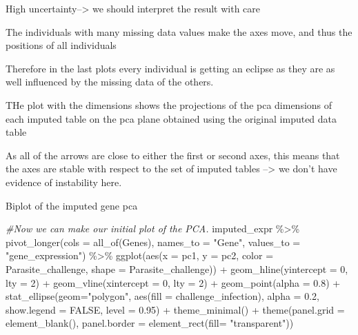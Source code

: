 \documentclass[
]{article}
\newenvironment{Shaded}{\begin{snugshade}}{\end{snugshade}}
\newcommand{\AttributeTok}[1]{\textcolor[rgb]{0.77,0.63,0.00}{#1}}
\newcommand{\CommentTok}[1]{\textcolor[rgb]{0.56,0.35,0.01}{\textit{#1}}}
\newcommand{\ConstantTok}[1]{\textcolor[rgb]{0.00,0.00,0.00}{#1}}
\newcommand{\DecValTok}[1]{\textcolor[rgb]{0.00,0.00,0.81}{#1}}
\newcommand{\FloatTok}[1]{\textcolor[rgb]{0.00,0.00,0.81}{#1}}
\newcommand{\FunctionTok}[1]{\textcolor[rgb]{0.00,0.00,0.00}{#1}}
\newcommand{\NormalTok}[1]{#1}
\newcommand{\SpecialCharTok}[1]{\textcolor[rgb]{0.00,0.00,0.00}{#1}}
\newcommand{\StringTok}[1]{\textcolor[rgb]{0.31,0.60,0.02}{#1}}
\begin{document}
High uncertainty--\textgreater{} we should interpret the result with
care

The individuals with many missing data values make the axes move, and
thus the positions of all individuals

Therefore in the last plots every individual is getting an eclipse as
they are as well influenced by the missing data of the others.

THe plot with the dimensions shows the projections of the pca dimensions
of each imputed table on the pca plane obtained using the original
imputed data table

As all of the arrows are close to either the first or second axes, this
means that the axes are stable with respect to the set of imputed tables
--\textgreater{} we don't have evidence of instability here.

Biplot of the imputed gene pca

\begin{Shaded}
\begin{Highlighting}[]
\CommentTok{\#Now we can make our initial plot of the PCA.}
\NormalTok{imputed\_expr }\SpecialCharTok{\%\textgreater{}\%} 
  \FunctionTok{pivot\_longer}\NormalTok{(}\AttributeTok{cols =} \FunctionTok{all\_of}\NormalTok{(Genes), }\AttributeTok{names\_to =} \StringTok{"Gene"}\NormalTok{, }\AttributeTok{values\_to =} \StringTok{"gene\_expression"}\NormalTok{)  }\SpecialCharTok{\%\textgreater{}\%}
  \FunctionTok{ggplot}\NormalTok{(}\FunctionTok{aes}\NormalTok{(}\AttributeTok{x =}\NormalTok{ pc1, }\AttributeTok{y =}\NormalTok{ pc2, }\AttributeTok{color =}\NormalTok{ Parasite\_challenge, }\AttributeTok{shape =}\NormalTok{ Parasite\_challenge)) }\SpecialCharTok{+}
  \FunctionTok{geom\_hline}\NormalTok{(}\AttributeTok{yintercept =} \DecValTok{0}\NormalTok{, }\AttributeTok{lty =} \DecValTok{2}\NormalTok{) }\SpecialCharTok{+}
  \FunctionTok{geom\_vline}\NormalTok{(}\AttributeTok{xintercept =} \DecValTok{0}\NormalTok{, }\AttributeTok{lty =} \DecValTok{2}\NormalTok{) }\SpecialCharTok{+}
  \FunctionTok{geom\_point}\NormalTok{(}\AttributeTok{alpha =} \FloatTok{0.8}\NormalTok{) }\SpecialCharTok{+}
  \FunctionTok{stat\_ellipse}\NormalTok{(}\AttributeTok{geom=}\StringTok{"polygon"}\NormalTok{, }\FunctionTok{aes}\NormalTok{(}\AttributeTok{fill =}\NormalTok{ challenge\_infection), }\AttributeTok{alpha =} \FloatTok{0.2}\NormalTok{, }\AttributeTok{show.legend =} \ConstantTok{FALSE}\NormalTok{,}
               \AttributeTok{level =} \FloatTok{0.95}\NormalTok{) }\SpecialCharTok{+}
  \FunctionTok{theme\_minimal}\NormalTok{() }\SpecialCharTok{+}
  \FunctionTok{theme}\NormalTok{(}\AttributeTok{panel.grid =} \FunctionTok{element\_blank}\NormalTok{(), }\AttributeTok{panel.border =} \FunctionTok{element\_rect}\NormalTok{(}\AttributeTok{fill=} \StringTok{"transparent"}\NormalTok{)) }
\end{Highlighting}
\end{Shaded}
\end{document}
